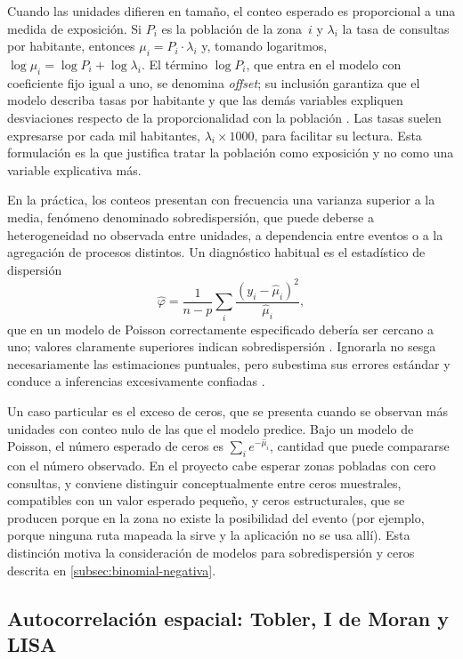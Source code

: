 Cuando las unidades difieren en tamaño, el conteo esperado es proporcional a una medida de
exposición. Si $P_i$ es la población de la zona~$i$ y $\lambda_i$ la tasa de consultas por
habitante, entonces $\mu_i = P_i \cdot \lambda_i$ y, tomando logaritmos,
$\log \mu_i = \log P_i + \log \lambda_i$. El término $\log P_i$, que entra en el modelo con
coeficiente fijo igual a uno, se denomina \textit{offset}; su inclusión garantiza que el
modelo describa tasas por habitante y que las demás variables expliquen desviaciones
respecto de la proporcionalidad con la población \parencite{cameron2013,hilbe2011}. Las
tasas suelen expresarse por cada mil habitantes, $\lambda_i \times 1000$, para facilitar su
lectura. Esta formulación es la que justifica tratar la población como exposición y no como
una variable explicativa más.

En la práctica, los conteos presentan con frecuencia una varianza superior a la media,
fenómeno denominado sobredispersión, que puede deberse a heterogeneidad no observada entre
unidades, a dependencia entre eventos o a la agregación de procesos distintos. Un
diagnóstico habitual es el estadístico de dispersión
\[
  \hat{\varphi} = \frac{1}{n - p} \sum_i \frac{(y_i - \hat{\mu}_i)^2}{\hat{\mu}_i},
\]
que en un modelo de Poisson correctamente especificado debería ser cercano a uno; valores
claramente superiores indican sobredispersión \parencite{hilbe2011}. Ignorarla no sesga
necesariamente las estimaciones puntuales, pero subestima sus errores estándar y conduce a
inferencias excesivamente confiadas \parencite{cameron2013}.

Un caso particular es el exceso de ceros, que se presenta cuando se observan más unidades
con conteo nulo de las que el modelo predice. Bajo un modelo de Poisson, el número esperado
de ceros es $\sum_i e^{-\hat{\mu}_i}$, cantidad que puede compararse con el número observado.
En el proyecto cabe esperar zonas pobladas con cero consultas, y conviene distinguir
conceptualmente entre ceros muestrales, compatibles con un valor esperado pequeño, y ceros
estructurales, que se producen porque en la zona no existe la posibilidad del evento (por
ejemplo, porque ninguna ruta mapeada la sirve y la aplicación no se usa allí). Esta
distinción motiva la consideración de modelos para sobredispersión y ceros descrita en
\ref{subsec:binomial-negativa}.

\subsection{Autocorrelación espacial: Tobler, I de Moran y LISA}
\label{subsec:autocorrelacion}

